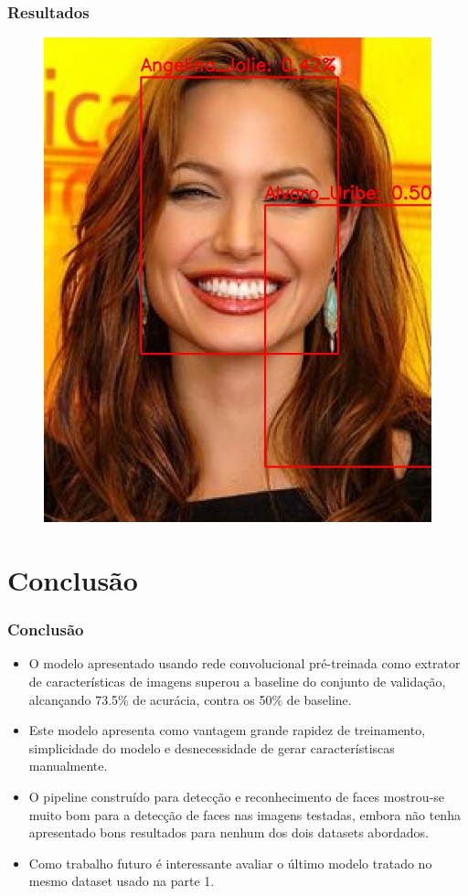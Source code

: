 \documentclass{beamer}
\begin{document}
\begin{frame}
\frametitle{Resultados}
\begin{figure}
\includegraphics[width=0.50\linewidth]{figs/Angelina_Jolie_3.jpg}
\end{figure}   
\end{frame}
\section{Conclusão}
\begin{frame}
\frametitle{Conclusão}
\begin{itemize}
    \item O modelo apresentado usando rede convolucional pré-treinada como extrator de características de imagens superou a baseline do conjunto de validação, alcançando 73.5\% de acurácia, contra os 50\% de baseline.
    \item Este modelo apresenta como vantagem grande rapidez de treinamento, simplicidade do modelo e desnecessidade de gerar característiscas manualmente.
    \item O pipeline construído para detecção e reconhecimento de faces mostrou-se muito bom para a detecção de faces nas imagens testadas, embora não tenha apresentado bons resultados para nenhum dos dois datasets abordados.
    \item Como trabalho futuro é interessante avaliar o último modelo tratado no mesmo dataset usado na parte 1.
\end{itemize}
\end{frame}
\end{document}
